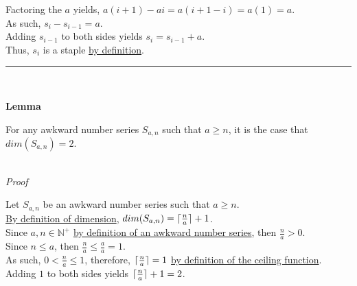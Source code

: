\documentclass[a4paper,12pt]{article}
\DeclarePairedDelimiter{\ceil}{\lceil}{\rceil}
\begin{document}
\noindent Factoring the $a$ yields, $a(i + 1) - ai = a(i + 1 - i) = a(1) = a$.\\

\noindent As such, $s_i - s_{i - 1} = a$.\\

\noindent Adding $s_{i - 1}$ to both sides yields $s_i = s_{i - 1} + a$.\\

\noindent Thus, $s_i$ is a staple \hyperlink{definition:staple}{by definition}.



\begin{center}
\noindent\rule{8cm}{0.4pt}
\end{center}
\noindent \\





\label{lemma:dimension_a_greater_equal_n}
\hypertarget{lemma:dimension_a_greater_equal_n}{}
\begin{tcolorbox}
\textbf{Lemma}

\noindent For any awkward number series $S_{a,n}$ such that $a \geq n$, it is the case that $dim(S_{a, n}) = 2$.

\end{tcolorbox}

\noindent \\
\textit{Proof}

\noindent Let $S_{a, n}$ be an awkward number series such that $a \geq n$.\\

\noindent \hyperlink{definition:dimension}{By definition of dimension}, $dim(S_{a,n}) = \ceil{\frac{n}{a}} + 1$.\\

\noindent Since $a, n \in \mathbb{N}^+$ \hyperlink{definition:awkward_number_series}{by definition of an awkward number series}, then $\frac{n}{a} > 0$.\\

\noindent Since $n \leq a$, then $\frac{n}{a} \leq \frac{a}{a} = 1$.\\

\noindent As such, $0 < \frac{n}{a} \leq 1$, therefore, $\ceil{\frac{n}{a}} = 1$ \hyperlink{definition:ceiling_function}{by definition of the ceiling function}.\\

\noindent Adding $1$ to both sides yields $\ceil{\frac{n}{a}} + 1 = 2$.\\
\end{document}
